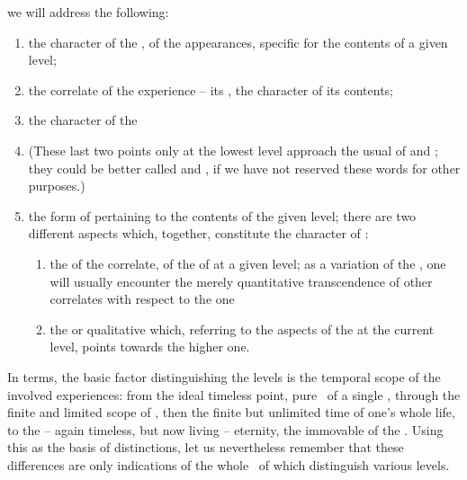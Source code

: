 we will address the following: 
\begin{enumerate}\MyLPar
\item\label{as:sig} the character of the ,  of the
 appearances, specific for the contents of a given level;
\item\label{as:cor} the correlate of the experience -- its , 
  the character of its contents; 
\item\label{as:sub} the character of the 
\item[{}](These last two 
  points only at the lowest level approach the usual  of
   and ; they could be better called  and
  , if we have not reserved these words for other purposes.)
\item\label{as:tra} the form of  pertaining to the contents of
the given level;
there are two different aspects which, together, 
constitute the character of :
\begin{enumerate}%
\item the  of the correlate, of the  of  at a given level; as a variation of the , one will usually 
encounter the merely quantitative transcendence of other correlates with
respect to the  one
\item the  or qualitative  which, referring to the 
 aspects of the  at the current level,  
points towards the higher one. 
\end{enumerate}
\end{enumerate}
In  terms, the basic factor distinguishing the levels is the
temporal scope of the involved experiences: from the ideal timeless point, pure
\herenow\ of a single , through the finite and limited scope of 
, then the finite but unlimited time of one's whole life,
to the -- again timeless, but now living -- eternity, the immovable  of the
. Using this as the basis of distinctions, let us nevertheless
remember that these differences are only indications of the whole \nexuss\ of
 which distinguish various levels.


